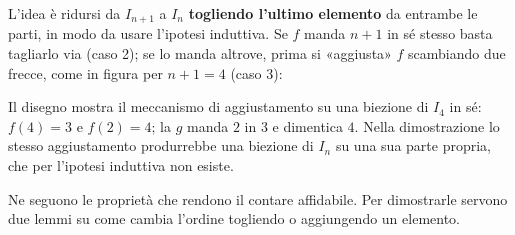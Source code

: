 \begin{spiegazione}
    L'idea è ridursi da $I_{n + 1}$ a $I_n$ \textbf{togliendo l'ultimo elemento} da entrambe le parti, in modo da usare l'ipotesi
    induttiva. Se $f$ manda $n + 1$ in sé stesso basta tagliarlo via (caso 2); se lo manda altrove, prima si «aggiusta» $f$
    scambiando due frecce, come in figura per $n + 1 = 4$ (caso 3):
    \begin{center}
    \end{center}
    Il disegno mostra il meccanismo di aggiustamento su una biezione di $I_4$ in sé: $f(4) = 3$ e $f(2) = 4$; la $g$ manda $2$ in $3$ e
    dimentica $4$. Nella dimostrazione lo stesso aggiustamento produrrebbe una biezione di $I_n$ su una sua parte propria, che per
    l'ipotesi induttiva non esiste.
\end{spiegazione}

Ne seguono le proprietà che rendono il contare affidabile. Per dimostrarle servono due lemmi su come cambia l'ordine
togliendo o aggiungendo un elemento.

